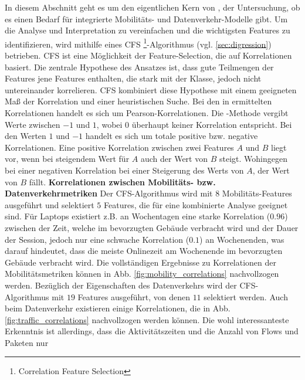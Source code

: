 \documentclass[12pt, a4paper]{article}
\begin{document}
In diesem Abschnitt geht es um den eigentlichen Kern von \cite{Alipour2018}, der Untersuchung, ob es einen Bedarf
für integrierte Mobilitäts- und Datenverkehr-Modelle gibt. Um die Analyse und Interpretation zu vereinfachen und die 
wichtigsten Features zu identifizieren, wird mithilfe eines \textsc{CFS} \footnote{Correlation Feature Selection}-Algorithmus
 (vgl. \ref{sec:digression}) betrieben. \textsc{CFS} ist eine Möglichkeit der Feature-Selection, die auf Korrelationen
basiert. Die zentrale Hypothese des Ansatzes ist, dass gute Teilmengen der Features jene Features enthalten, die stark
mit der Klasse, jedoch nicht untereinander korrelieren. \textsc{CFS} kombiniert diese Hypothese mit einem geeigneten
Maß der Korrelation und einer heuristischen Suche. \cite{Hall2000}
Bei den in \cite{Alipour2018} ermittelten Korrelationen handelt es sich um Pearson-Korrelationen.
Die -Methode vergibt Werte zwischen $-1$ und $1$, wobei $0$ überhaupt keiner Korrelation
entspricht. Bei den Werten $1$ und $-1$ handelt es sich um totale positive bzw. negative Korrelationen.
Eine positive Korrelation zwischen zwei Features $A$ und $B$ liegt vor, wenn bei steigendem Wert für $A$
auch der Wert von $B$ steigt. Wohingegen bei einer negativen Korrelation bei einer Steigerung des Werts von $A$, 
der Wert von $B$ fällt. \cite{Nettleton2014}
\newline\newline
\textbf{Korrelationen zwischen Mobilitäts- bzw. Datenverkehrmetriken}\newline
Der \textsc{CFS}-Algorithmus wird mit $8$ Mobilitäts-Features ausgeführt und selektiert $5$ Features, 
die für eine kombinierte Analyse geeignet sind. Für Laptops existiert z.B. an Wochentagen eine starke Korrelation ($0.96$)
zwischen der Zeit, welche im bevorzugten Gebäude verbracht wird und der Dauer der Session, jedoch nur eine schwache Korrelation
($0.1$) an Wochenenden, was darauf hindeutet, dass die meiste Onlinezeit am Wochenende im bevorzugten
Gebäude verbracht wird. \cite{Alipour2018} Die vollständigen Ergebnisse zu Korrelationen der Mobilitätsmetriken können in
Abb. \ref{fig:mobility_correlations} nachvollzogen werden.\newline
Bezüglich der Eigenschaften des Datenverkehrs wird der \textsc{CFS}-Algorithmus mit $19$ Features ausgeführt, von denen $11$
selektiert werden. Auch beim Datenverkehr existieren einige Korrelationen, die in Abb. \ref{fig:traffic_correlations} nachvollzogen werden können.
Die wohl interessanteste Erkenntnis ist allerdings, dass die Aktivitätszeiten und die Anzahl von Flows und Paketen nur
\end{document}
